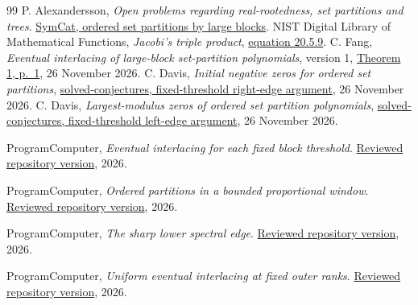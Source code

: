 \documentclass[11pt]{article}
\begin{document}
\begingroup
\small
\begin{thebibliography}{99}
\setlength{\itemsep}{0pt}
 P. Alexandersson, \emph{Open problems regarding real-rootedness, set partitions and trees}. \href{https://www.symmetricfunctions.com/realRootedOpenProblems.htm\#openProblemsSetPartitions}{SymCat, ordered set partitions by large blocks}.
 NIST Digital Library of Mathematical Functions, \emph{Jacobi's triple product}, \href{https://dlmf.nist.gov/20.5.E9}{equation 20.5.9}.
 C. Fang, \emph{Eventual interlacing of large-block set-partition polynomials}, version 1, \href{https://hexagonmath.org/pdf/2611.01129v1}{Theorem 1, p.~1}, 26 November 2026.
 C. Davis, \emph{Initial negative zeros for ordered set partitions}, \href{https://github.com/1337isnot1337/solved-conjectures/blob/f1a5ac298febcfd20b19e1ef3465325eb62e18d6/research/alexandersson-ordered-set-partitions/edge.md}{solved-conjectures, fixed-threshold right-edge argument}, 26 November 2026.
 C. Davis, \emph{Largest-modulus zeros of ordered set partition polynomials}, \href{https://github.com/1337isnot1337/solved-conjectures/blob/e39bd018c0f980ff394daa7764272226890c6d14/research/alexandersson-ordered-set-partitions/left-edge.md}{solved-conjectures, fixed-threshold left-edge argument}, 26 November 2026.

 ProgramComputer, \emph{Eventual interlacing for each fixed block threshold}. \href{https://github.com/ProgramComputer/open-math-research/blob/8624d14aef697bf2b515881bdda873228c0b5b50/topics/ordered-large-blocks/all-fixed-thresholds.md}{Reviewed repository version}, 2026.

 ProgramComputer, \emph{Ordered partitions in a bounded proportional window}. \href{https://github.com/ProgramComputer/open-math-research/blob/8624d14aef697bf2b515881bdda873228c0b5b50/topics/ordered-large-blocks/proportional-window.md}{Reviewed repository version}, 2026.

 ProgramComputer, \emph{The sharp lower spectral edge}. \href{https://github.com/ProgramComputer/open-math-research/blob/8624d14aef697bf2b515881bdda873228c0b5b50/topics/ordered-large-blocks/lower-spectral-edge.md}{Reviewed repository version}, 2026.

 ProgramComputer, \emph{Uniform eventual interlacing at fixed outer ranks}. \href{https://github.com/ProgramComputer/open-math-research/blob/8624d14aef697bf2b515881bdda873228c0b5b50/topics/ordered-large-blocks/outer-ranks/README.md}{Reviewed repository version}, 2026.


\end{thebibliography}
\end{document}
